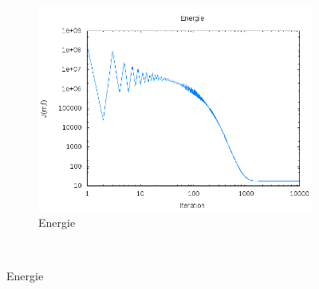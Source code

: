 \documentclass[a4paper,12pt]{article}
\begin{document}
\begin{figure}[!h]
\begin{subfigure}[b]{0.3\linewidth}
	\end{subfigure}
	~
	\begin{subfigure}[b]{0.35\linewidth}
	\includegraphics[width=\textwidth]{img/2DGaussian/energie.png}
	\caption{Energie}
	\end{subfigure}
	~
	

\end{figure}
\end{document}

